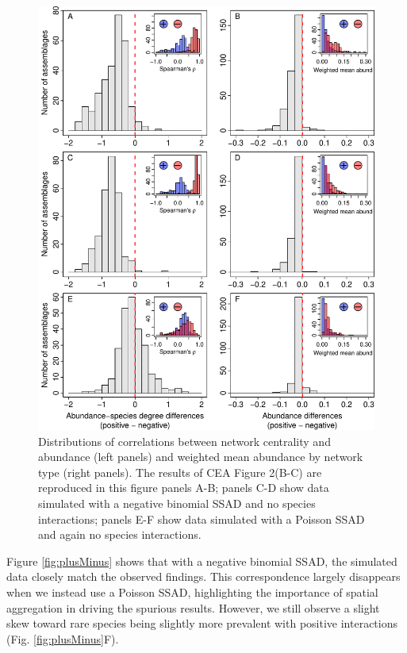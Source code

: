 \documentclass[]{article}
\begin{document}
\begin{figure}

{\centering \includegraphics{RarePlusComMinus_files/figure-latex/fig_plusMinus-1} 

}

\caption{Distributions of correlations between network centrality and abundance (left panels) and weighted mean abundance by network type (right panels). The results of CEA Figure 2(B-C) are reproduced in this figure panels A-B; panels C-D show data simulated with a negative binomial SSAD and no species interactions; panels E-F show data simulated with a Poisson SSAD and again no species interactions. \label{fig:plusMinus}}\label{fig:fig_plusMinus}
\end{figure}

Figure \ref{fig:plusMinus} shows that with a negative binomial SSAD, the
simulated data closely match the observed findings. This correspondence
largely disappears when we instead use a Poisson SSAD, highlighting the
importance of spatial aggregation in driving the spurious results.
However, we still observe a slight skew toward rare species being
slightly more prevalent with positive interactions (Fig.
\ref{fig:plusMinus}F).
\end{document}
